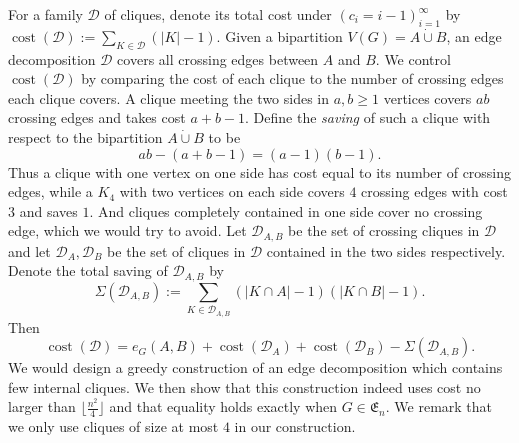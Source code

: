 \documentclass[11pt]{article}
\numberwithin{equation}{section}
\theoremstyle{remark}
\DeclareMathOperator{\cost}{cost}
\newcommand{\dotcupunion}{\mathbin{\dot\cup}}
\begin{document}
For a family \(\mathcal{D}\) of cliques, denote its total cost under \((c_i=i-1)_{i=1}^\infty\) by
\(
\cost(\mathcal{D}) := \sum_{K\in\mathcal D}(|K|-1).
\)
Given a bipartition \(V(G)=A\dotcupunion B\), an edge decomposition \(\mathcal D\) covers all crossing edges between \(A\) and \(B\).
We control \(\cost(\mathcal D)\) by comparing the cost of each clique to the number of crossing edges each clique covers.
A clique meeting the two sides in \(a,b\ge1\) vertices covers \(ab\) crossing edges and takes cost \(a+b-1\). 
Define the \emph{saving} of such a clique with respect to the bipartition \(A\dotcupunion B\) to be
\begin{equation*}
 ab-(a+b-1)=(a-1)(b-1).
\end{equation*}
Thus a clique with one vertex on one side has cost equal to its number of crossing edges,
while a \(K_4\) with two vertices on each side covers \(4\) crossing edges with cost \(3\) and saves \(1\).
And cliques completely contained in one side cover no crossing edge, which we would try to avoid.
Let \(\mathcal D_{A,B}\) be the set of crossing cliques in \(\mathcal D\) and let
\(\mathcal D_A,\mathcal D_B\) be the set of cliques in \(\mathcal D\) contained in the two sides respectively.
Denote the total saving of \(\mathcal D_{A,B}\) by
\begin{equation*}
 \Sigma(\mathcal D_{A,B})
 :=\sum_{K\in\mathcal D_{A,B}}
   (|K\cap A|-1)(|K\cap B|-1).
\end{equation*}
Then
\begin{equation}\label{dec:eq:1.2}
 \cost(\mathcal D)
 =e_G(A,B)+\cost(\mathcal D_A)+\cost(\mathcal D_B)
  -\Sigma(\mathcal D_{A,B}).
\end{equation}
We would design a greedy construction of an edge decomposition which contains few internal cliques.
We then show that this construction indeed uses cost no larger than \(\lfloor \frac{n^2}{4}\rfloor\)
and that equality holds exactly when \(G\in \mathfrak{E}_n\).
We remark that we only use cliques of size at most \(4\) in our construction.
\end{document}
